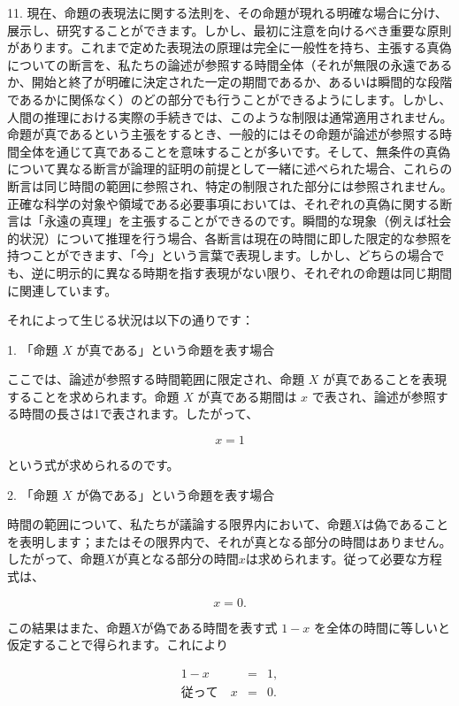 \documentclass[a4paper,11pt,openany]{ltjsbook}
\begin{document}
11. 現在、命題の表現法に関する法則を、その命題が現れる明確な場合に分け、展示し、研究することができます。しかし、最初に注意を向けるべき重要な原則があります。これまで定めた表現法の原理は完全に一般性を持ち、主張する真偽についての断言を、私たちの論述が参照する時間全体（それが無限の永遠であるか、開始と終了が明確に決定された一定の期間であるか、あるいは瞬間的な段階であるかに関係なく）のどの部分でも行うことができるようにします。しかし、人間の推理における実際の手続きでは、このような制限は通常適用されません。命題が真であるという主張をするとき、一般的にはその命題が論述が参照する時間全体を通じて真であることを意味することが多いです。そして、無条件の真偽について異なる断言が論理的証明の前提として一緒に述べられた場合、これらの断言は同じ時間の範囲に参照され、特定の制限された部分には参照されません。正確な科学の対象や領域である必要事項においては、それぞれの真偽に関する断言は「永遠の真理」を主張することができるのです。瞬間的な現象（例えば社会的状況）について推理を行う場合、各断言は現在の時間に即した限定的な参照を持つことができます、「今」という言葉で表現します。しかし、どちらの場合でも、逆に明示的に異なる時期を指す表現がない限り、それぞれの命題は同じ期間に関連しています。

それによって生じる状況は以下の通りです：

1. 「命題 $X$ が真である」という命題を表す場合

ここでは、論述が参照する時間範囲に限定され、命題 $X$ が真であることを表現することを求められます。命題 $X$ が真である期間は $x$ で表され、論述が参照する時間の長さは1で表されます。したがって、

\[
x = 1
\]

という式が求められるのです。

2. 「命題 $X$ が偽である」という命題を表す場合

時間の範囲について、私たちが議論する限界内において、命題$X$は偽であることを表明します；またはその限界内で、それが真となる部分の時間はありません。したがって、命題$X$が真となる部分の時間$x$は求められます。従って必要な方程式は、

\begin{equation}
x = 0.
\end{equation}

この結果はまた、命題$X$が偽である時間を表す式 $1-x$ を全体の時間に等しいと仮定することで得られます。これにより

\begin{eqnarray*}
1 - x &=& 1, \\
従って \quad x &=& 0.
\end{eqnarray*}
\end{document}

